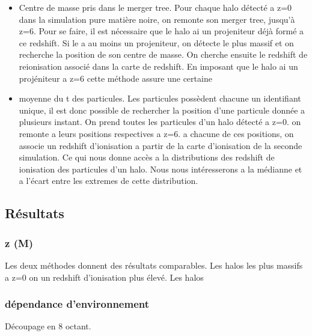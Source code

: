 \begin{itemize}
\item  Centre de masse pris dans le merger tree.
Pour chaque halo détecté a z=0 dans la simulation pure matière noire, on remonte son merger tree, jusqu'à z=6.
Pour se faire, il est nécessaire que le halo ai un projeniteur déjà formé a ce redshift.
Si le a au moins un projeniteur, on détecte le plus massif et on recherche la position de son centre de masse.
On cherche ensuite le redshift de reionisation associé dans la carte de redshift.
En imposant que le halo ai un projéniteur a z=6 cette méthode assure une certaine 

\item moyenne du t des particules.
Les particules possèdent chacune un identifiant unique, il est donc possible de rechercher la position d'une particule donnée a plusieurs instant.
On prend toutes les particules d'un halo détecté a z=0. 
on remonte a leurs positions respectives a z=6.
a chacune de ces positions, on associe un redshift d'ionisation a partir de la carte d'ionisation de la seconde simulation.
Ce qui nous donne accès a la distributions des redshift de ionisation des particules d'un halo.
Nous nous intéresserons a la médianne et a l'écart entre les extremes de cette distribution.
\end{itemize}





\subsection{Résultats}

\subsubsection{z (M)}

Les deux méthodes donnent des résultats comparables.
Les halos les plus massifs a z=0 on un redshift d'ionisation plus élevé.
Les halos 


%
%


\subsubsection{dépendance d'environnement }

Découpage en 8 octant.

